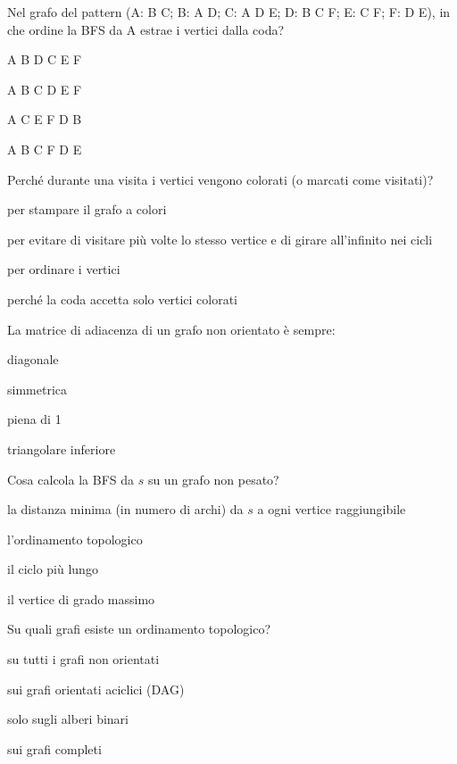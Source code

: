 \begin{quiz}{Nel grafo del pattern (A: B C; B: A D; C: A D E; D: B C F; E: C F; F: D E), in che ordine la BFS da A estrae i vertici dalla coda?}
  \item A B D C E F
  \item A B C D E F
  \item A C E F D B
  \item A B C F D E
\end{quiz}

\begin{quiz}{Perché durante una visita i vertici vengono colorati (o marcati come visitati)?}
  \item per stampare il grafo a colori
  \item per evitare di visitare più volte lo stesso vertice e di girare all'infinito nei cicli
  \item per ordinare i vertici
  \item perché la coda accetta solo vertici colorati
\end{quiz}

\begin{quiz}{La matrice di adiacenza di un grafo non orientato è sempre:}
  \item diagonale
  \item simmetrica
  \item piena di 1
  \item triangolare inferiore
\end{quiz}

\begin{quiz}{Cosa calcola la BFS da $s$ su un grafo non pesato?}
  \item la distanza minima (in numero di archi) da $s$ a ogni vertice raggiungibile
  \item l'ordinamento topologico
  \item il ciclo più lungo
  \item il vertice di grado massimo
\end{quiz}

\begin{quiz}{Su quali grafi esiste un ordinamento topologico?}
  \item su tutti i grafi non orientati
  \item sui grafi orientati aciclici (DAG)
  \item solo sugli alberi binari
  \item sui grafi completi
\end{quiz}


